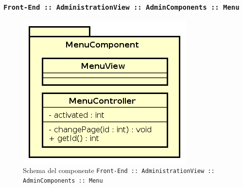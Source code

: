 \documentclass[../DefinizioneDiProdotto.tex]{subfiles}
\begin{document}
	\subsubsection{ \texttt{Front-End :: AdministrationView :: AdminComponents :: Menu}}
		\begin{figure}[!h]
			\centering
			\includegraphics[scale=0.7]{Architettura/Front-End/Administration/AdminComponents/Menu.png}
			\caption{Schema del componente \texttt{Front-End :: AdministrationView :: AdminComponents :: Menu}}
		\end{figure}
\end{document}
